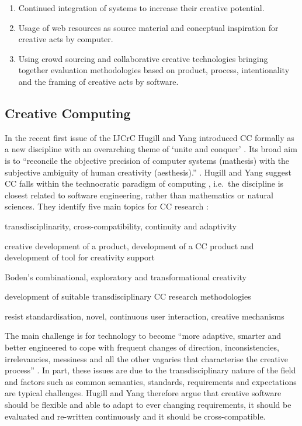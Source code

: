 \begin{enumerate}
  \item Continued integration of systems to increase their creative potential.
  \item Usage of web resources as source material and conceptual inspiration for creative acts by computer.
  \item Using crowd sourcing and collaborative creative technologies bringing together evaluation methodologies based on product, process, intentionality and the framing of creative acts by software.
\end{enumerate}


\subsection{Creative Computing}
\label{s:creacomp}

In the recent first issue of the \ac{IJCrC} Hugill and Yang introduced \ac{CC} formally as a new discipline \citeyear{Hugill2013c} with an overarching theme of `unite and conquer' \autocite[p.1, his emphasis]{Yang2013}. Its broad aim is to ``reconcile the objective precision of computer systems (mathesis) with the subjective ambiguity of human creativity (aesthesis).'' \autocite[p.5]{Hugill2013c}. Hugill and Yang suggest \ac{CC} falls within the technocratic paradigm of computing \autocite[see also][p.8]{Eden2007}, i.e.\ the discipline is closest related to software engineering, rather than mathematics or natural sciences. They identify five main topics for \ac{CC} research \autocite[p.15-17]{Hugill2013c}:

\begin{description}[leftmargin=2.2cm]
  \item [Challenges] transdisciplinarity, cross-compatibility, continuity and adaptivity
  \item [Types] creative development of a product, development of a \ac{CC} product and development of tool for creativity support
  \item [Mechanisms]	Boden’s combinational, exploratory and transformational creativity
  \item [Methods] development of suitable transdisciplinary \ac{CC} research methodologies
  \item [Standards] resist standardisation, novel, continuous user interaction, creative mechanisms
\end{description}

The main challenge is for technology  to become ``more adaptive, smarter and better engineered to cope with frequent changes of direction, inconsistencies, irrelevancies, messiness and all the other vagaries that characterise the creative process'' \autocite[p.5]{Hugill2013c}. In part, these issues are due to the transdisciplinary nature of the field and factors such as common semantics, standards, requirements and expectations are typical challenges. Hugill and Yang therefore argue that creative software should be flexible and able to adapt to ever changing requirements, it should be evaluated and re-written continuously and it should be cross-compatible.

